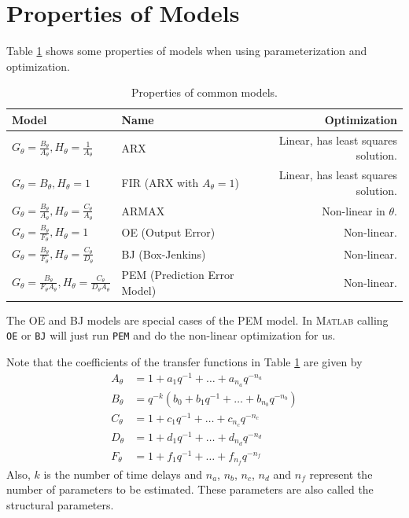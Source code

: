 \section{Properties of Models}
Table \ref{tab:models} shows some properties of models when using parameterization and optimization.

\begin{table}[ht!]
\caption{Properties of common models.}
\small
\centering
\begin{tabular}{@{}llr@{}}
\toprule
Model & Name & Optimization \\
\midrule
$G_\theta=\frac{B_\theta}{A_\theta}, H_\theta=\frac{1}{A_\theta}$ & ARX & Linear, has least squares solution. \\
$G_\theta=B_\theta, H_\theta=1$ & FIR (ARX with $A_\theta=1$) & Linear, has least squares solution. \\
$G_\theta=\frac{B_\theta}{A_\theta}, H_\theta=\frac{C_\theta}{A_\theta}$ & ARMAX & Non-linear in $\theta$. \\
$G_\theta=\frac{B_\theta}{F_\theta}, H_\theta=1$ & OE (Output Error) & Non-linear. \\
$G_\theta=\frac{B_\theta}{F_\theta}, H_\theta=\frac{C_\theta}{D_\theta}$ & BJ (Box-Jenkins) & Non-linear. \\
$G_\theta=\frac{B_\theta}{F_\theta A_\theta}, H_\theta=\frac{C_\theta}{D_\theta A_\theta}$ & PEM (Prediction Error Model) & Non-linear. \\
\bottomrule
\end{tabular}
\label{tab:models}
\end{table}

The OE and BJ models are special cases of the PEM model. In \textsc{Matlab} calling \texttt{OE} or \texttt{BJ} will just run \texttt{PEM} and do the non-linear optimization for us.

Note that the coefficients of the transfer functions in Table \ref{tab:models} are given by
\begin{align*}
A_\theta &= 1+a_1q^{-1}+\ldots+a_{n_a}q^{-n_a} \\
B_\theta &= q^{-k}(b_0+b_1q^{-1}+\ldots+b_{n_b}q^{-n_b}) \\
C_\theta &= 1+c_1q^{-1}+\ldots+c_{n_c}q^{-n_c} \\
D_\theta &= 1+d_1q^{-1}+\ldots+d_{n_d}q^{-n_d} \\
F_\theta &= 1+f_1q^{-1}+\ldots+f_{n_f}q^{-n_f}
\end{align*}
Also, $k$ is the number of time delays and $n_a$, $n_b$, $n_c$, $n_d$ and $n_f$ represent the number of parameters to be estimated. These parameters are also called the structural parameters.

